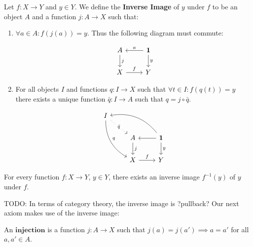 \begin{definition}[$\dagger$]
Let $f: X \longrightarrow Y$ and $y \in Y$. We define the \textbf{Inverse Image} of $y$ under $f$ to be an object $A$ and a function $j:A \longrightarrow X$ such that:
\begin{enumerate}
\item $\forall a \in A: f(j(a)) = y$. Thus the following diagram must commute:

\begin{equation*}
\begin{tikzcd}
A \arrow[d, "j"]
& \mathbf{1} \arrow[d, "y"] \arrow[l, "a", swap] \\
 X \arrow[r, "f"]
& Y
\end{tikzcd}
\end{equation*}

\item For all objects $I$ and functions $q: I \longrightarrow X$ such that $\forall t \in I: f(q(t)) = y$ there exists a unique function $\bar{q}: I \longrightarrow A$ such that $q = j \circ \bar{q}$.

\begin{equation*}
\begin{tikzcd}
I
\arrow[ddr, bend right, "q"]
\arrow[dr, dotted, "{\bar{q}}" description] & & \\
& A \arrow[d, "j"]
& \mathbf{1} \arrow[d, "y"] \arrow[l, ""]
\arrow[ull, bend right, ""] \\
& X \arrow[r, "f"]
& Y
\end{tikzcd}
\end{equation*}


\end{enumerate}
\end{definition}

\begin{axiom}
For every function $f: X \longrightarrow Y$, $y \in Y$, there exists an inverse image $f^{-1}(y)$ of $y$ under $f$.
\end{axiom}

\begin{remark}
TODO: In terms of category theory, the inverse image is ?pullback?
Our next axiom makes use of the inverse image:
\end{remark}

\begin{definition}
An $\textbf{injection}$ is a function $j:A \longrightarrow X$ such that $j(a) = j(a') \implies a = a'$ for all $a,a' \in A$.
\end{definition}

